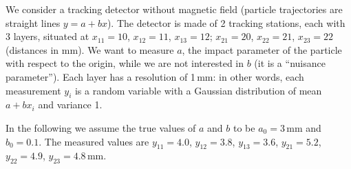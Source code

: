 \documentclass[a4paper,12pt]{article}
\begin{document}
 We consider a tracking detector without magnetic field (particle trajectories are straight lines $y = a + bx$). The detector is made of 2 tracking stations, each with 3 layers,
 situated at $x_{11} = 10$, $x_{12} = 11$, $x_{13} = 12$; $x_{21} = 20$, $x_{22} = 21$, $x_{23} = 22$ (distances in mm). We want to measure $a$, the impact parameter of the particle with respect to the origin, while we are not interested in $b$ (it is a ``nuisance parameter''). Each layer has a resolution of 1\,mm: in other words, each measurement $y_i$ is a random variable
 with a Gaussian distribution of mean $a + bx_i$ and variance 1.
 
 In the following we assume the true values of $a$ and $b$ to be $a_0=3$\,mm and $b_0=0.1$. The measured values are $y_{11} = 4.0$, $y_{12} = 3.8$, $y_{13} = 3.6$, $y_{21} = 5.2$, $y_{22} = 4.9$, $y_{23} = 4.8$\,mm.
 
\end{document}
